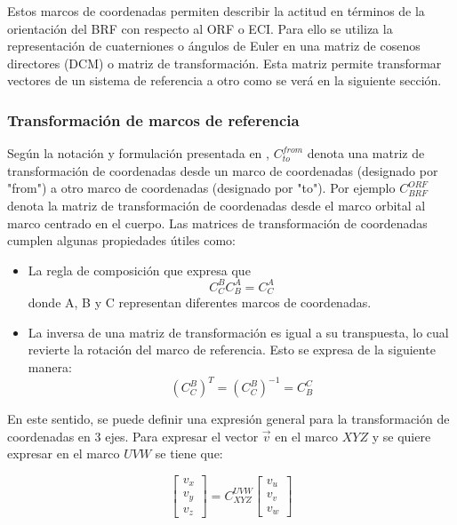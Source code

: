 Estos marcos de coordenadas permiten describir la actitud en términos de la orientación del BRF con respecto al ORF o ECI. Para ello se utiliza la representación de cuaterniones o ángulos de Euler en una matriz de cosenos directores (DCM) o matriz de transformación. Esta matriz permite transformar vectores de un sistema de referencia a otro como se verá en la siguiente sección.

\subsubsection{Transformación de marcos de referencia}
\hfill \break
Según la notación y formulación presentada en \cite{grewal2007global},  $C_{to}^{from}$ denota una matriz de transformación de coordenadas desde un
marco de coordenadas (designado por "from") a otro marco de coordenadas (designado por "to"). Por ejemplo $C_{BRF}^{ORF}$ denota la matriz de transformación de coordenadas desde el marco orbital al marco centrado en el cuerpo. Las matrices de transformación de coordenadas cumplen algunas propiedades útiles como:

\begin{itemize}
	
	\item La regla de composición que expresa que 
	\begin{equation}
		C_{C}^{B} C_{B}^{A} = C_{C}^{A}\label{eq:transformada1}
	\end{equation}
	donde A, B y C representan diferentes marcos de coordenadas.
	
	\item La inversa de una matriz de transformación es igual a su transpuesta, lo cual revierte la rotación del marco de referencia. Esto se expresa de la siguiente manera:
		\begin{equation}
			 \left(C_{C}^{B}\right)^T = \left(C_{C}^{B}\right)^{-1} = C_{B}^{C}\label{eq:transformada2}
		\end{equation}
		
\end{itemize}

En este sentido, se puede definir una expresión general para la transformación de coordenadas en 3 ejes. Para expresar el vector $\vec{v}$ en el marco $XYZ$ y se quiere expresar en el marco $UVW$ se tiene que:

$$
\left[\begin{array}{c}
	v_x\\
	v_y\\
	v_z
\end{array}\right] = 
C_{XYZ}^{UVW}
\left[\begin{array}{c}
	v_u\\
	v_v\\
	v_w
\end{array}\right]
$$

